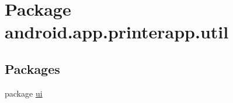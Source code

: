 \hypertarget{namespaceandroid_1_1app_1_1printerapp_1_1util}{}\section{Package android.\+app.\+printerapp.\+util}
\label{namespaceandroid_1_1app_1_1printerapp_1_1util}
\subsection*{Packages}
\begin{DoxyCompactItemize}
\item 
package \hyperlink{namespaceandroid_1_1app_1_1printerapp_1_1util_1_1ui}{ui}
\end{DoxyCompactItemize}
